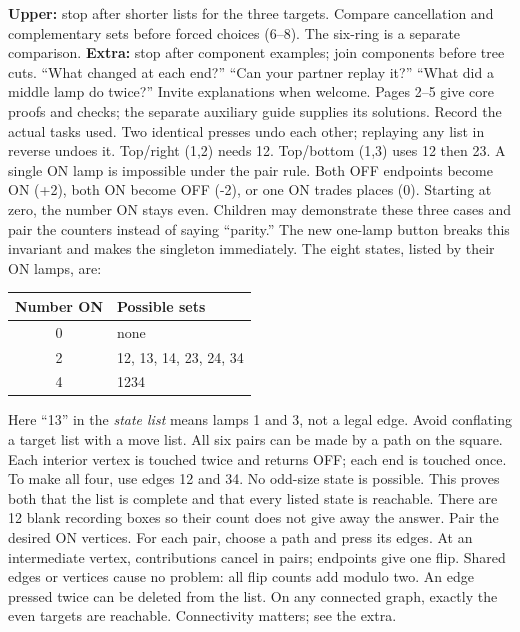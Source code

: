 \documentclass[12pt]{extarticle}
\begin{document}
\textbf{Upper:} stop after shorter lists for the three targets. Compare cancellation and complementary sets before forced choices (6--8). The six-ring is a separate comparison. \textbf{Extra:} stop after component examples; join components before tree cuts.
``What changed at each end?'' ``Can your partner replay it?'' ``What did a middle lamp do twice?'' Invite explanations when welcome. Pages 2--5 give core proofs and checks; the separate auxiliary guide supplies its solutions. Record the actual tasks used.
\newpage
{}
Two identical presses undo each other; replaying any list in reverse undoes it. Top/right (1,2) needs 12. Top/bottom (1,3) uses 12 then 23. A single ON lamp is impossible under the pair rule. Both OFF endpoints become ON (+2), both ON become OFF (-2), or one ON trades places (0). Starting at zero, the number ON stays even. Children may demonstrate these three cases and pair the counters instead of saying ``parity.'' The new one-lamp button breaks this invariant and makes the singleton immediately.
The eight states, listed by their ON lamps, are:
\begin{center}\begin{tabular}{c|l}Number ON&Possible sets\\\hline 0&none\\2&12, 13, 14, 23, 24, 34\\4&1234\end{tabular}\end{center}
Here ``13'' in the \emph{state list} means lamps 1 and 3, not a legal edge. Avoid conflating a target list with a move list. All six pairs can be made by a path on the square. Each interior vertex is touched twice and returns OFF; each end is touched once. To make all four, use edges 12 and 34. No odd-size state is possible. This proves both that the list is complete and that every listed state is reachable. There are 12 blank recording boxes so their count does not give away the answer.
Pair the desired ON vertices. For each pair, choose a path and press its edges. At an intermediate vertex, contributions cancel in pairs; endpoints give one flip. Shared edges or vertices cause no problem: all flip counts add modulo two. An edge pressed twice can be deleted from the list. On any connected graph, exactly the even targets are reachable. Connectivity matters; see the extra.
\end{document}
